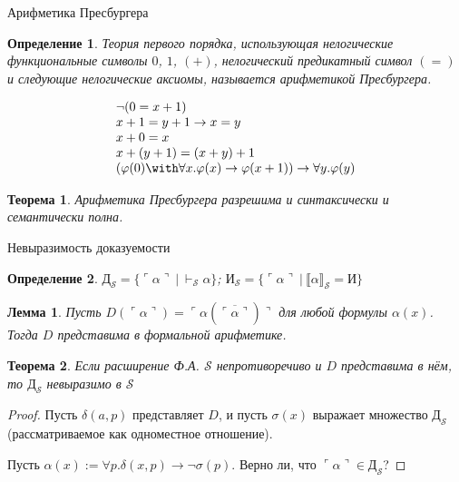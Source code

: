 \documentclass[aspectratio=169]{beamer}
\newtheorem{thm}{Теорема}[section]
\newtheorem{dfn}{Определение}[section]
\newtheorem{lmm}{Лемма}[section]
\begin{document}
\begin{frame}{Арифметика Пресбургера}
\begin{dfn}Теория первого порядка, использующая нелогические функциональные символы $0$, $1$, $(+)$, нелогический
предикатный символ $(=)$ и следующие нелогические аксиомы, называется арифметикой Пресбургера.

$$\begin{array}{l}
\neg (0 = x + 1) \\
x + 1 = y + 1 \rightarrow x = y\\
x + 0 = x \\
x + (y + 1) = (x + y) + 1\\
(\varphi(0) \with \forall x.\varphi(x) \rightarrow \varphi(x+1)) \rightarrow \forall y.\varphi(y)
\end{array}$$\end{dfn}

\begin{thm}Арифметика Пресбургера разрешима и синтаксически и семантически полна.\end{thm}
\end{frame}

\begin{frame}{Невыразимость доказуемости}
\begin{dfn}
$\text{Д}_\mathcal{S} = \{ \ulcorner\alpha\urcorner\ |\ \vdash_\mathcal{S}\alpha \}$; 
$\text{И}_\mathcal{S} = \{ \ulcorner\alpha\urcorner\ |\ \llbracket\alpha\rrbracket_\mathcal{S} = \text{И} \}$
\end{dfn}

\begin{lmm}Пусть $D(\ulcorner\alpha\urcorner) = \ulcorner\alpha(\overline{\ulcorner\alpha\urcorner})\urcorner$ для
любой формулы $\alpha(x)$. Тогда $D$ представима в формальной арифметике.
\end{lmm}


\begin{thm}Если расширение Ф.А. $\mathcal{S}$ непротиворечиво и $D$ представима в нём, то $\text{Д}_\mathcal{S}$ невыразимо в $\mathcal{S}$\end{thm}

\begin{proof}Пусть $\delta(a,p)$ представляет $D$, и пусть $\sigma(x)$ выражает множество $\text{Д}_\mathcal{S}$ (рассматриваемое как
одноместное отношение).

Пусть $\alpha(x) := \forall p.\delta(x,p)\rightarrow\neg\sigma(p)$. Верно ли, что $\ulcorner\alpha\urcorner\in\text{Д}_\mathcal{S}$?
\end{proof}
\end{frame}
\end{document}
